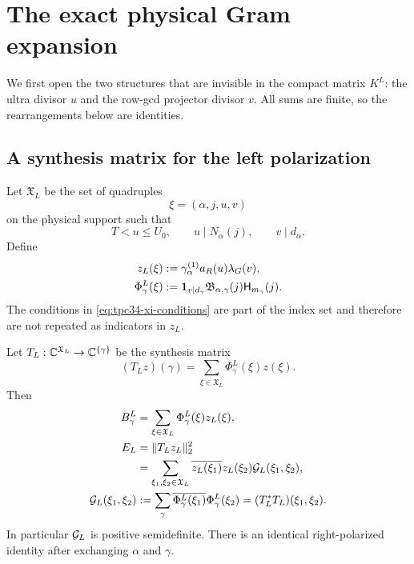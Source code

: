 \section{The exact physical Gram expansion}
\label{sec:tpc34-exact-gram}

We first open the two structures that are invisible in the compact matrix
\(K^L\): the ultra divisor \(u\) and the row-gcd projector divisor \(v\).
All sums are finite, so the rearrangements below are identities.

\subsection{A synthesis matrix for the left polarization}

Let \(\mathfrak X_L\) be the set of quadruples
\begin{equation}
 \xi=(\alpha,j,u,v)
 \label{eq:tpc34-xi}
\end{equation}
on the physical support such that
\begin{equation}
 T<u\le U_0,\qquad u\mid N_\alpha(j),\qquad v\mid d_\alpha.
 \label{eq:tpc34-xi-conditions}
\end{equation}
Define
\begin{align}
 z_L(\xi)
 &:=
 \gamma_\alpha^{(1)}a_R(u)\lambda_G(v),
 \label{eq:tpc34-z-left}\\
 \Phi_\gamma^L(\xi)
 &:=
 \mathbf 1_{v\mid d_\gamma}
 \mathfrak B_{\alpha,\gamma}(j)
 \mathsf H_{m_\gamma}(j).
 \label{eq:tpc34-Phi-left}
\end{align}
The conditions in \eqref{eq:tpc34-xi-conditions} are part of the index
set and therefore are not repeated as indicators in \(z_L\).

\begin{theorem}
\label{thm:tpc34-exact-Gram}
Let \(T_L:\mathbb C^{\mathfrak X_L}\to\mathbb C^{\{\gamma\}}\) be the synthesis matrix
\begin{equation}
 (T_Lz)(\gamma)=\sum_{\xi\in\mathfrak X_L}
 \Phi_\gamma^L(\xi)z(\xi).
 \label{eq:tpc34-synthesis-map}
\end{equation}
Then
\begin{align}
 B_\gamma^L
 &=\sum_{\xi\in\mathfrak X_L}
 \Phi_\gamma^L(\xi)z_L(\xi),
 \label{eq:tpc34-opened-left-column}\\
 E_L
 &=\|T_Lz_L\|_2^2
 \notag\\
 &=\sum_{\xi_1,\xi_2\in\mathfrak X_L}
 \overline{z_L(\xi_1)}z_L(\xi_2)
 \mathcal G_L(\xi_1,\xi_2),
 \label{eq:tpc34-exact-left-Gram}\\
 \mathcal G_L(\xi_1,\xi_2)
 &:=
 \sum_\gamma
 \overline{\Phi_\gamma^L(\xi_1)}
 \Phi_\gamma^L(\xi_2)
 =(T_L^*T_L)(\xi_1,\xi_2).
 \label{eq:tpc34-left-Gram-kernel}
\end{align}
In particular \(\mathcal G_L\) is positive semidefinite.  There is an identical
right-polarized identity after exchanging \(\alpha\) and \(\gamma\).
\end{theorem}


